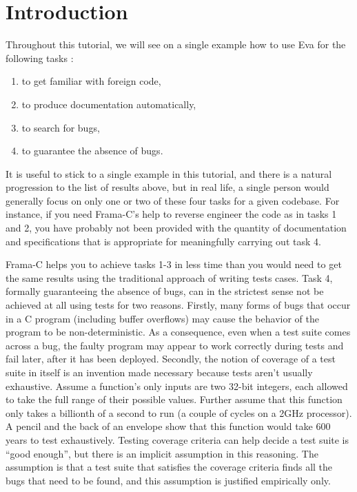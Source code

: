 \documentclass[web]{frama-c-book}
\newcommand{\Eva}{\textsf{Eva}}
\begin{document}
\vspace{2cm}

\section{Introduction}

Throughout this tutorial, we will see on a single example how to use
\Eva{} for the following tasks :
\begin{enumerate}
\item to get familiar with foreign code,
\item to produce documentation automatically,
\item to search for bugs, 
\item to guarantee the absence of bugs.
\end{enumerate}
It is useful to stick to a single example in this tutorial, and
there is a natural progression to the list of results above,
but in real life, a single person would generally focus on
only one or two of these four tasks for a given
codebase. For instance, if you need Frama-C's help to reverse
engineer the code as in tasks 1 and 2, you have
probably not been provided with the quantity of documentation
and specifications
that is appropriate for meaningfully carrying out task 4.

Frama-C helps you to achieve tasks 1-3 in less time than you would
need to get the same results using the traditional approach of writing
tests cases. Task 4, formally guaranteeing the absence of bugs, can in
the strictest sense not be achieved at all using tests for two
reasons.  Firstly, many forms of bugs that occur in a C program
(including buffer overflows) may cause the behavior of the program to
be non-deterministic.  As a consequence, even when a test suite comes
across a bug, the faulty program may appear to work correctly during
tests and fail later, after it has been deployed.  Secondly, the
notion of coverage of a test suite in itself is an invention made
necessary because tests aren't usually exhaustive.  Assume a
function's only inputs are two 32-bit integers, each allowed to take
the full range of their possible values.  Further assume that this
function only takes a billionth of a second to run (a couple of cycles
on a 2GHz processor).  A pencil and the back of an envelope show that
this function would take 600 years to test exhaustively.  Testing
coverage criteria can help decide a test suite is ``good enough'', but
there is an implicit assumption in this reasoning.  The assumption is
that a test suite that satisfies the coverage criteria finds all the
bugs that need to be found, and this assumption is justified
empirically only.
\end{document}
